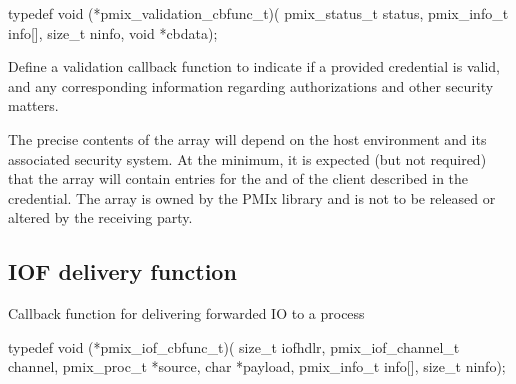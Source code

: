\format

\cspecificstart
\begin{codepar}
typedef void (*pmix_validation_cbfunc_t)(
                             pmix_status_t status,
                             pmix_info_t info[], size_t ninfo,
                             void *cbdata);
\end{codepar}
\cspecificend

\begin{arglist}
\end{arglist}

\descr

Define a validation callback function to indicate if a provided credential is valid, and any corresponding information regarding authorizations and other security matters.

\adviceuserstart
The precise contents of the array will depend on the host environment and its associated security system. At the minimum, it is expected (but not required) that the array will contain entries for the  and  of the client described in the credential. The  array is owned by the \ac{PMIx} library and is not to be released or altered by the receiving party.
\adviceuserend

\subsection{IOF delivery function}

\summary

Callback function for delivering forwarded \ac{IO} to a process

\format

\cspecificstart
\begin{codepar}
typedef void (*pmix_iof_cbfunc_t)(
                             size_t iofhdlr, pmix_iof_channel_t channel,
                             pmix_proc_t *source, char *payload,
                             pmix_info_t info[], size_t ninfo);
\end{codepar}
\cspecificend


